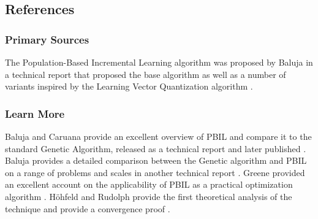 

\subsection{References}

% 
% 
\subsubsection{Primary Sources}
The Population-Based Incremental Learning algorithm was proposed by Baluja in a technical report that proposed the base algorithm as well as a number of variants inspired by the Learning Vector Quantization algorithm \cite{Baluja1994}.


% 
% 
\subsubsection{Learn More}
Baluja and Caruana provide an excellent overview of PBIL and compare it to the standard Genetic Algorithm, released as a technical report \cite{Baluja1995} and later published \cite{Baluja1995a}. Baluja provides a detailed comparison between the Genetic algorithm and PBIL on a range of problems and scales in another technical report \cite{Baluja1995b}.
Greene provided an excellent account on the applicability of PBIL as a practical optimization algorithm \cite{Greene1996}.
H\"ohfeld and Rudolph provide the first theoretical analysis of the technique and provide a convergence proof \cite{Hohfeld1997}.


